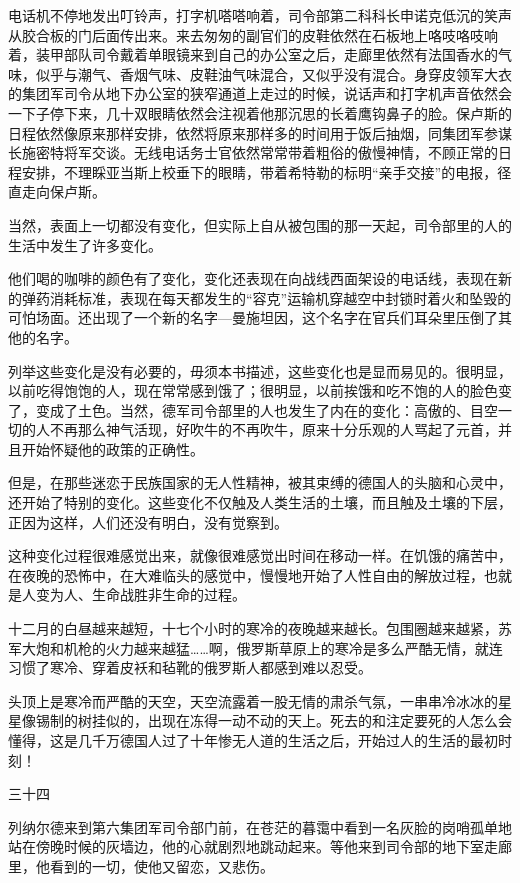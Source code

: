 电话机不停地发出叮铃声，打字机嗒嗒响着，司令部第二科科长申诺克低沉的笑声从胶合板的门后面传出来。来去匆匆的副官们的皮鞋依然在石板地上咯吱咯吱响着，装甲部队司令戴着单眼镜来到自己的办公室之后，走廊里依然有法国香水的气味，似乎与潮气、香烟气味、皮鞋油气味混合，又似乎没有混合。身穿皮领军大衣的集团军司令从地下办公室的狭窄通道上走过的时候，说话声和打字机声音依然会一下子停下来，几十双眼睛依然会注视着他那沉思的长着鹰钩鼻子的脸。保卢斯的日程依然像原来那样安排，依然将原来那样多的时间用于饭后抽烟，同集团军参谋长施密特将军交谈。无线电话务士官依然常常带着粗俗的傲慢神情，不顾正常的日程安排，不理睬亚当斯上校垂下的眼睛，带着希特勒的标明“亲手交接”的电报，径直走向保卢斯。

当然，表面上一切都没有变化，但实际上自从被包围的那一天起，司令部里的人的生活中发生了许多变化。

他们喝的咖啡的颜色有了变化，变化还表现在向战线西面架设的电话线，表现在新的弹药消耗标准，表现在每天都发生的“容克”运输机穿越空中封锁时着火和坠毁的可怕场面。还出现了一个新的名字—曼施坦因，这个名字在官兵们耳朵里压倒了其他的名字。

列举这些变化是没有必要的，毋须本书描述，这些变化也是显而易见的。很明显，以前吃得饱饱的人，现在常常感到饿了；很明显，以前挨饿和吃不饱的人的脸色变了，变成了土色。当然，德军司令部里的人也发生了内在的变化：高傲的、目空一切的人不再那么神气活现，好吹牛的不再吹牛，原来十分乐观的人骂起了元首，并且开始怀疑他的政策的正确性。

但是，在那些迷恋于民族国家的无人性精神，被其束缚的德国人的头脑和心灵中，还开始了特别的变化。这些变化不仅触及人类生活的土壤，而且触及土壤的下层，正因为这样，人们还没有明白，没有觉察到。

这种变化过程很难感觉出来，就像很难感觉出时间在移动一样。在饥饿的痛苦中，在夜晚的恐怖中，在大难临头的感觉中，慢慢地开始了人性自由的解放过程，也就是人变为人、生命战胜非生命的过程。

十二月的白昼越来越短，十七个小时的寒冷的夜晚越来越长。包围圈越来越紧，苏军大炮和机枪的火力越来越猛……啊，俄罗斯草原上的寒冷是多么严酷无情，就连习惯了寒冷、穿着皮袄和毡靴的俄罗斯人都感到难以忍受。

头顶上是寒冷而严酷的天空，天空流露着一股无情的肃杀气氛，一串串冷冰冰的星星像锡制的树挂似的，出现在冻得一动不动的天上。死去的和注定要死的人怎么会懂得，这是几千万德国人过了十年惨无人道的生活之后，开始过人的生活的最初时刻！

三十四

列纳尔德来到第六集团军司令部门前，在苍茫的暮霭中看到一名灰脸的岗哨孤单地站在傍晚时候的灰墙边，他的心就剧烈地跳动起来。等他来到司令部的地下室走廊里，他看到的一切，使他又留恋，又悲伤。

